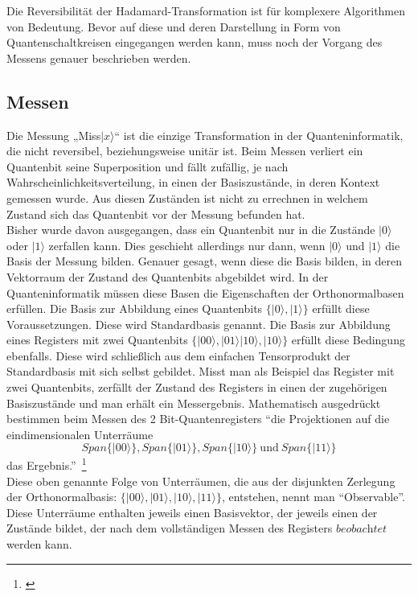 Die Reversibilität der Hadamard-Transformation ist für komplexere Algorithmen von Bedeutung. Bevor auf diese und deren Darstellung in Form von Quantenschaltkreisen eingegangen werden kann, muss noch der Vorgang des Messens genauer beschrieben werden.
\subsection{Messen}

Die Messung „Miss$\left|x\right.\rangle$“ ist die einzige Transformation in der Quanteninformatik, die nicht reversibel, beziehungsweise unitär ist. Beim Messen verliert ein Quantenbit seine Superposition und fällt zufällig, je nach Wahrscheinlichkeitsverteilung, in einen der Basiszustände, in deren Kontext gemessen wurde. Aus diesen Zuständen ist nicht zu errechnen in welchem Zustand sich das Quantenbit vor der Messung befunden hat. \\
Bisher wurde davon ausgegangen, dass ein Quantenbit nur in die Zustände $\left|0\right.\rangle$ oder $\left|1\right.\rangle$ zerfallen kann. Dies geschieht allerdings nur dann, wenn $\left|0\right.\rangle$ und $\left|1\right.\rangle$ die Basis der Messung bilden. Genauer gesagt, wenn diese die Basis bilden, in deren Vektorraum der Zustand des Quantenbits abgebildet wird. 
In der Quanteninformatik müssen diese Basen die Eigenschaften der Orthonormalbasen erfüllen. Die Basis zur Abbildung eines Quantenbits $\{\left|0\right.\rangle,\left|1\right.\rangle\}$ erfüllt diese Voraussetzungen. Diese wird Standardbasis genannt. Die Basis zur Abbildung eines Registers mit zwei Quantenbits $\{\left|00\right.\rangle,\left|01\right.\rangle\left|10\right.\rangle,\left|10\right.\rangle\}$ erfüllt diese Bedingung ebenfalls. Diese wird schließlich aus dem einfachen Tensorprodukt der Standardbasis mit sich selbst gebildet. 
Misst man als Beispiel das Register mit zwei Quantenbits, zerfällt der Zustand des Registers in einen der zugehörigen Basiszustände und man erhält ein Messergebnis.
Mathematisch ausgedrückt bestimmen beim Messen des 2 Bit-Quantenregisters ``die Projektionen auf die eindimensionalen Unterräume 
$$Span\{\left|00\right.\rangle\},Span\{\left|01\right.\rangle\},Span\{\left|10\right.\rangle\}\ \text{und}\ Span\{\left|11\right.\rangle\}$$
das Ergebnis.''\ \footnote{\cite[S. 47]{homeister_quantum_2022}} \\
Diese oben genannte Folge von Unterräumen, die aus der disjunkten Zerlegung der Orthonormalbasis: $\{\left|00\right.\rangle,\left|01\right.\rangle,\left|10\right.\rangle,\left|11\right.\rangle\}$, entstehen, nennt man ``Observable''.
Diese Unterräume enthalten jeweils einen Basisvektor, der jeweils einen der Zustände bildet, der nach dem vollständigen Messen des Registers $\textit{beobachtet}$ werden kann.\\

